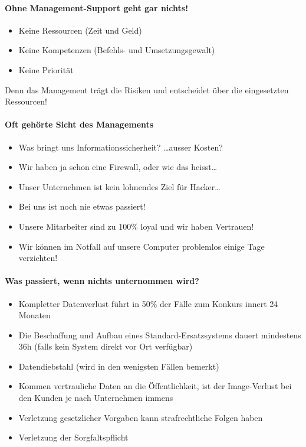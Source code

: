 \documentclass[10pt,a4paper]{article}
\begin{document}
\paragraph*{Ohne Management-Support geht gar nichts!}
\begin{itemize}[noitemsep,topsep=0pt,leftmargin=*]
    \item Keine Ressourcen (Zeit und Geld)
    \item Keine Kompetenzen (Befehls- und Umsetzungsgewalt)
    \item Keine Priorität
\end{itemize}
Denn das Management trägt die Risiken und entscheidet über die eingesetzten Ressourcen!

\paragraph*{Oft gehörte Sicht des Managements}
\begin{itemize}[noitemsep,topsep=0pt,leftmargin=*]
    \item Was bringt uns Informationssicherheit? \dots ausser Kosten?
    \item Wir haben ja schon eine Firewall, oder wie das heisst\dots
    \item Unser Unternehmen ist kein lohnendes Ziel für Hacker\dots
    \item Bei uns ist noch nie etwas passiert!
    \item Unsere Mitarbeiter sind zu 100\% loyal und wir haben Vertrauen!
    \item Wir können im Notfall auf unsere Computer problemlos einige Tage verzichten!
\end{itemize}

\paragraph*{Was passiert, wenn nichts unternommen wird?}
\begin{itemize}[noitemsep,topsep=0pt,leftmargin=*]
    \item Kompletter Datenverlust führt in 50\% der Fälle zum Konkurs innert 24 Monaten
    \item Die Beschaffung und Aufbau eines Standard-Ersatzsystems dauert mindestens 36h (falls kein System direkt vor Ort verfügbar)
    \item Datendiebstahl (wird in den wenigsten Fällen bemerkt)
    \item Kommen vertrauliche Daten an die Öffentlichkeit, ist der Image-Verlust bei den Kunden je nach Unternehmen immens
    \item Verletzung gesetzlicher Vorgaben kann strafrechtliche Folgen haben
    \item Verletzung der Sorgfaltspflicht
\end{itemize}
\end{document}
